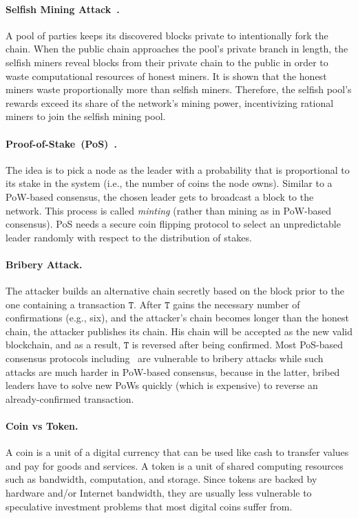 \documentclass[11pt]{article}
\theoremstyle{mytheoremstyle}
\begin{document}
\paragraph{Selfish Mining Attack~\cite{eyal2014}.} A pool of parties keeps its discovered blocks private to intentionally fork the chain. When the public chain approaches the pool's private branch in length, the selfish miners reveal blocks from their private chain to the public in order to waste computational resources of honest miners. It is shown that the honest miners waste proportionally more than selfish miners. Therefore, the selfish pool's rewards exceed its share of the network's mining power, incentivizing rational miners to join the selfish mining pool.

\paragraph{Proof-of-Stake~(PoS)~\cite{Ouroboros:crypto:2017}.} The idea is to pick a node as the leader with a probability that is proportional to its stake in the system (i.e., the number of coins the node owns). Similar to a PoW-based consensus, the chosen leader gets to broadcast a block to the network. This process is called \emph{minting} (rather than mining as in PoW-based consensus). PoS needs a secure coin flipping protocol to select an unpredictable leader randomly with respect to the distribution of stakes.

\paragraph{Bribery Attack.} The attacker builds an alternative chain secretly based on the block prior to the one containing a transaction $\mathtt{T}$. After $\mathtt{T}$ gains the necessary number of confirmations (e.g., six), and the attacker's chain becomes longer than the honest chain, the attacker publishes its chain. His chain will be accepted as the new valid blockchain, and as a result, $\mathtt{T}$ is reversed after being confirmed. Most PoS-based consensus protocols including~\cite{Ouroboros:crypto:2017,algorand16} are vulnerable to bribery attacks while such attacks are much harder in PoW-based consensus, because in the latter, bribed leaders have to solve new PoWs quickly (which is expensive) to reverse an already-confirmed transaction.

\paragraph{Coin vs Token.} A coin is a unit of a digital currency that can be used like cash to transfer values and pay for goods and services. A token is a unit of shared computing resources such as bandwidth, computation, and storage. Since tokens are backed by hardware and/or Internet bandwidth, they are usually less vulnerable to speculative investment problems that most digital coins suffer from.


\end{document}
